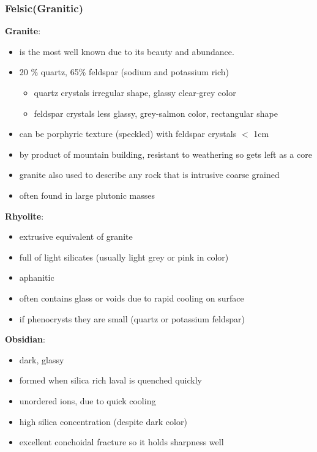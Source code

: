 \documentclass{article}
\begin{document}
\subsubsection{Felsic(Granitic)} %
\label{subsub:felsic}

\textbf{Granite}:
\begin{itemize}
    \item is the most well known due to its beauty and abundance.
    \item 20 \% quartz, 65\% feldspar (sodium and potassium rich)
    \begin{itemize}
        \item quartz crystals irregular shape, glassy clear-grey color
        \item feldspar crystals less glassy, grey-salmon color, rectangular shape
    \end{itemize}
    \item can be porphyric texture (speckled) with feldspar crystals $<$ 1cm
    \item by product of mountain building, resistant to weathering so gets left as a core
    \item granite also used to describe any rock that is intrusive coarse grained
    \item often found in large plutonic masses
\end{itemize}

\textbf{Rhyolite}:
\begin{itemize}
    \item extrusive equivalent of granite
    \item full of light silicates (usually light grey or pink in color)
    \item aphanitic
    \item often contains glass or voids due to rapid cooling on surface
    \item if phenocrysts they are small (quartz or potassium feldspar)
\end{itemize}

\textbf{Obsidian}:
\begin{itemize}
    \item dark, glassy
    \item formed when silica rich laval is quenched quickly
    \item unordered ions, due to quick cooling
    \item high silica concentration (despite dark color)
    \item excellent conchoidal fracture so it holds sharpness well
\end{itemize}
\end{document}
